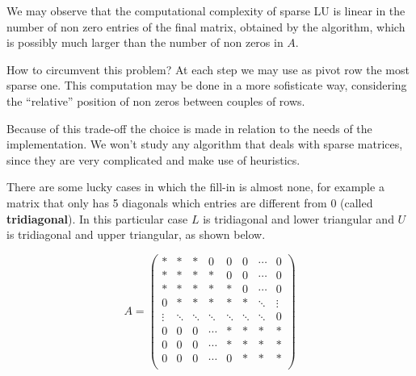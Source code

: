 \documentclass[computational_mathematics.tex]{subfiles}
\begin{document}
We may observe that the computational complexity of sparse LU is linear in the number of non zero entries of the final matrix, obtained by the algorithm, which is possibly much larger than the number of non zeros in $A$.

How to circumvent this problem? At each step we may use as pivot row the most sparse one. This computation may be done in a more sofisticate way, considering the ``relative'' position of non zeros between couples of rows.

Because of this trade-off the choice is made in relation to the needs of the implementation. We won't study any algorithm that deals with sparse matrices, since they are very complicated and make use of heuristics.

There are some lucky cases in which the fill-in is almost none, for example a matrix that only has 5 diagonals which entries are different from $0$ (called \textbf{tridiagonal}). In this particular case $L$ is tridiagonal and lower triangular and $U$ is tridiagonal and upper triangular, as shown below.

\[
A = \begin{pmatrix}
  \ast & \ast & \ast & 0 & 0 & 0  &\cdots & 0\\
  \ast & \ast & \ast & \ast & 0 & 0 & \cdots & 0\\
  \ast & \ast & \ast & \ast & \ast & 0 & \cdots & 0\\
  0 & \ast & \ast & \ast & \ast & \ast & \ddots & \vdots\\
  \vdots & \ddots & \ddots & \ddots & \ddots & \ddots & \ddots & 0\\
  0 & 0 & 0 & \cdots & \ast & \ast & \ast & \ast\\
  0 & 0 & 0 & \cdots & \ast & \ast & \ast & \ast\\
  0 & 0 & 0 & \cdots & 0 & \ast & \ast & \ast\\

\end{pmatrix}
\]
\end{document}
